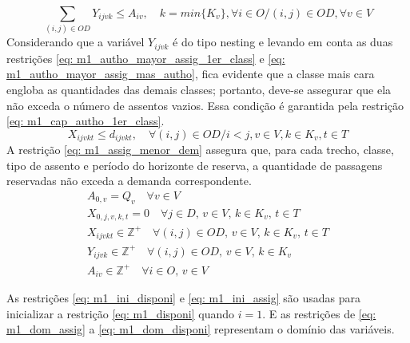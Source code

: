 \begin{equation}
	\sum_{(i,j) \in OD} Y_{ijvk} \leq A_{iv}, \quad  k = min\{K_v\}, \forall i \in O / (i,j) \in OD,   \forall v \in V      \label{eq: m1_cap_autho_1er_class}
\end{equation}
Considerando que a variável $Y_{ijvk}$ é do tipo nesting e levando em conta as duas restrições \eqref{eq: m1_autho_mayor_assig_1er_class} e \eqref{eq: m1_autho_mayor_assig_mas_autho}, fica evidente que a classe mais cara engloba as quantidades das demais classes; portanto, deve-se assegurar que ela não exceda o número de assentos vazios. Essa condição é garantida pela restrição \eqref{eq: m1_cap_autho_1er_class}.
\begin{equation}
	X_{ijvkt} \leq d_{ijvkt},  \quad \forall (i,j) \in OD / i < j  ,v \in V, k \in K_v, t\in T  \label{eq: m1_assig_menor_dem}
\end{equation}
A restrição \eqref{eq: m1_assig_menor_dem} assegura que, para cada trecho, classe, tipo de assento e período do horizonte de reserva, a quantidade de passagens reservadas não exceda a demanda correspondente.
\allowdisplaybreaks
\begin{gather}
	A_{0,v} = Q_v \quad \forall v \in V \label{eq: m1_ini_disponi} \\
	X_{0,j,v,k,t} = 0 \quad \forall j \in D,\, v \in V,\, k \in K_v,\, t \in T \label{eq: m1_ini_assig} \\
	X_{ijvkt} \in \mathbb{Z}^+ \quad \forall(i,j) \in OD,\, v \in V,\, k \in K_v,\, t \in T \label{eq: m1_dom_assig} \\
	Y_{ijvk} \in \mathbb{Z}^+ \quad \forall(i,j) \in OD,\, v \in V,\, k \in K_v \label{eq: m1_dom_autho} \\
	A_{iv} \in \mathbb{Z}^+ \quad \forall i \in O,\, v \in V \label{eq: m1_dom_disponi}
\end{gather}

As restrições \eqref{eq: m1_ini_disponi} e \eqref{eq: m1_ini_assig} são usadas para inicializar a restrição \eqref{eq: m1_disponi} quando \(i = 1\). E as restrições de \eqref{eq: m1_dom_assig} a \eqref{eq: m1_dom_disponi} representam o domínio das variáveis.

